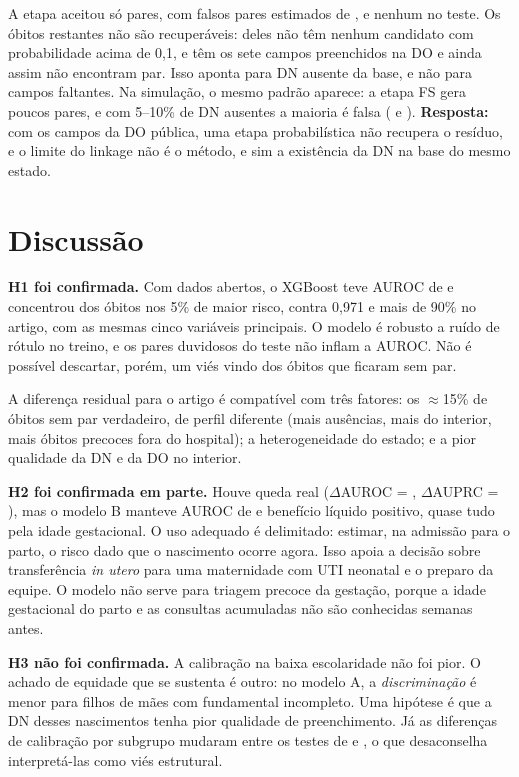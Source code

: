 \documentclass[12pt]{article}
\begin{document}
A etapa aceitou só \vFsN{} pares, com falsos pares estimados de \vFsFalsos{}, e nenhum no teste. Os óbitos restantes não são recuperáveis: \vFsPostBaixoPct{} deles não têm nenhum candidato com probabilidade acima de 0,1, e \vFsCompletos{} têm os sete campos preenchidos na DO e ainda assim não encontram par. Isso aponta para DN ausente da base, e não para campos faltantes. Na simulação, o mesmo padrão aparece: a etapa FS gera poucos pares, e com 5--10\% de DN ausentes a maioria é falsa (\vSimSemCincoFsFalsos{} e \vSimSemDezFsFalsos{}). \textbf{Resposta:} com os campos da DO pública, uma etapa probabilística não recupera o resíduo, e o limite do linkage não é o método, e sim a existência da DN na base do mesmo estado.

\section{Discussão}

\textbf{H1 foi confirmada.} Com dados abertos, o XGBoost teve AUROC de \AXgbAuroc{} e concentrou \AXgbTop{} dos óbitos nos 5\% de maior risco, contra 0,971 e mais de 90\% no artigo, com as mesmas cinco variáveis principais. O modelo é robusto a ruído de rótulo no treino, e os pares duvidosos do teste não inflam a AUROC. Não é possível descartar, porém, um viés vindo dos óbitos que ficaram sem par.

A diferença residual para o artigo é compatível com três fatores: os $\approx$15\% de óbitos sem par verdadeiro, de perfil diferente (mais ausências, mais do interior, mais óbitos precoces fora do hospital); a heterogeneidade do estado; e a pior qualidade da DN e da DO no interior.

\textbf{H2 foi confirmada em parte.} Houve queda real ($\Delta$AUROC = \dAB{}, $\Delta$AUPRC = \dABprc{}), mas o modelo B manteve AUROC de \BXgbAuroc{} e benefício líquido positivo, quase tudo pela idade gestacional. O uso adequado é delimitado: estimar, na admissão para o parto, o risco dado que o nascimento ocorre agora. Isso apoia a decisão sobre transferência \emph{in utero} para uma maternidade com UTI neonatal e o preparo da equipe. O modelo não serve para triagem precoce da gestação, porque a idade gestacional do parto e as consultas acumuladas não são conhecidas semanas antes.

\textbf{H3 não foi confirmada.} A calibração na baixa escolaridade não foi pior. O achado de equidade que se sustenta é outro: no modelo A, a \emph{discriminação} é menor para filhos de mães com fundamental incompleto. Uma hipótese é que a DN desses nascimentos tenha pior qualidade de preenchimento. Já as diferenças de calibração por subgrupo mudaram entre os testes de \anoTesteAnt{} e \anoTeste{}, o que desaconselha interpretá-las como viés estrutural.
\end{document}
